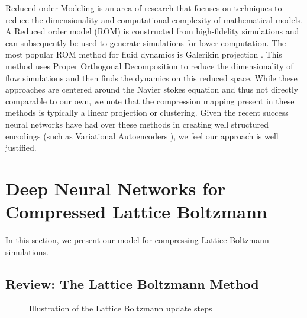 \documentclass{article}
\begin{document}
Reduced order Modeling is an area of research that focuses on techniques to reduce the dimensionality and computational complexity of mathematical models. A Reduced order model (ROM) is constructed from high-fidelity simulations and can subsequently be used to generate simulations for lower computation. The most popular ROM method for fluid dynamics is Galerikin projection \cite{barone2009reduced}. This method uses Proper Orthogonal Decomposition to reduce the dimensionality of flow simulations and then finds the dynamics on this reduced space.  
While these approaches are centered around the Navier stokes equation and thus not directly comparable to our own, we note that the compression mapping present in these methods is typically a linear projection or clustering. Given the recent success neural networks have had over these methods in creating well structured encodings (such as Variational Autoencoders \cite{kingma2013auto} \cite{watter2015embed}), we feel our approach is well justified.

\section{Deep Neural Networks for Compressed Lattice Boltzmann}

In this section, we present our model for compressing Lattice Boltzmann simulations.

\subsection{Review: The Lattice Boltzmann Method}

\begin{figure}[!t]
\centering
{}
\caption{Illustration of the Lattice Boltzmann update steps}
\label{lattice_boltzmann}
\end{figure}
\end{document}
